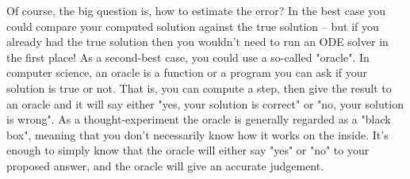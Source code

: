 \documentclass[hidelinks,notitlepage]{book}
\begin{document}
Of course, the big question is, how to estimate the error?  In the best case you could compare your computed solution against the true solution -- but if you already had the true solution then you wouldn't need to run an ODE solver in the first place!  As a second-best case, you could use a so-called "oracle".  In computer science, an oracle is a function or a program you can ask if your solution is true or not.  That is, you can compute a step, then give the result to an oracle and it will say either "yes, your solution is correct" or "no, your solution is wrong".  As a thought-experiment the oracle is generally regarded as a "black box", meaning that you don't necessarily know how it works on the inside.  It's enough to simply know that the oracle will either say "yes" or "no" to your proposed answer, and the oracle will give an accurate judgement.
\end{document}
